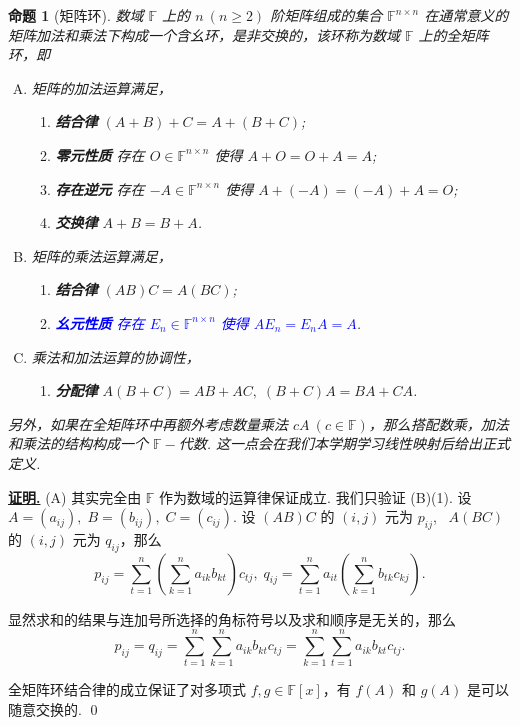 \documentclass[10pt,openany]{article}
\theoremstyle{thmstyle} %
\theoremstyle{defstyle} %
\theoremstyle{prostyle} %
\newtheorem{proposition}[theorem]{命题}
\theoremstyle{exastyle}
\theoremstyle{remstyle}
\renewenvironment{proof}[1][证明]{\par\underline{\textbf{#1.}} \;\fangsong}{\qed\par}
\newcommand{\F}{\mathbb{F}}
\begin{document}
\begin{proposition}[矩阵环]
	数域 \( \F \) 上的 \( n \ (n  \geq 2) \) 阶矩阵组成的集合 \( \F^{n \times n} \) 在通常意义的矩阵加法和乘法下构成一个含幺环，是非交换的，该环称为数域 \( \F \) 上的全矩阵环，即
	\begin{enumerate}[(A)]
		\item 矩阵的加法运算满足，
		\begin{enumerate}[(1)]
			\item \textbf{结合律} \( (A+B)+C=A+(B+C) \);
			\item \textbf{零元性质} 存在 \( O \in \F^{n \times n} \) 使得 \( A+O=O+A=A \);
			\item \textbf{存在逆元} 存在 \( -A \in \F^{n \times n} \) 使得 \( A+(-A)=(-A)+A=O \);
			\item \textbf{交换律} \( A+B=B+A \).
		\end{enumerate}
		\item 矩阵的乘法运算满足，
		\begin{enumerate}[(1)]
			\item \textbf{结合律} \( (AB)C=A(BC) \);
			\item \textcolor{blue}{\textbf{幺元性质} 存在 \( E_n \in \F^{n \times n} \) 使得 \( AE_n=E_nA=A \)}.
		\end{enumerate}
		\item 乘法和加法运算的协调性，
		\begin{enumerate}[(1)]
			\item \textbf{分配律} \( A(B+C)=AB+AC, \; (B+C)A=BA+CA \).
		\end{enumerate}
	\end{enumerate}
	
	另外，如果在全矩阵环中再额外考虑数量乘法 \( cA \ (c \in \F) \)，那么搭配数乘，加法和乘法的结构构成一个 \( \F-\)代数. 这一点会在我们本学期学习线性映射后给出正式定义.
\end{proposition}

\begin{proof}
    (A) 其实完全由 \( \F \) 作为数域的运算律保证成立. 我们只验证 (B)(1). 设 \( A=(a_{ij}), \; B=(b_{ij}), \; C=(c_{ij})\). 设 \( (AB)C \) 的 \( (i,j) \) 元为 \( p_{ij} \), \ \( A(BC) \) 的 \( (i,j) \) 元为 \( q_{ij} \)，那么
    \[ p_{ij}=\sum_{t=1}^{n}\left(\sum_{k=1}^{n}a_{ik}b_{kt} \right) c_{tj}, \; q_{ij}= \sum_{t=1}^{n} a_{it} \left( \sum_{k=1}^{n} b_{tk}c_{kj} \right). \]
    
    显然求和的结果与连加号所选择的角标符号以及求和顺序是无关的，那么
    \[ p_{ij}=q_{ij}=\sum_{t=1}^{n}\sum_{k=1}^{n}a_{ik}b_{kt}c_{tj}=\sum_{k=1}^{n}\sum_{t=1}^{n}a_{ik}b_{kt}c_{tj}. \]
    
    全矩阵环结合律的成立保证了对多项式 \( f,g \in \F[x] \)，有 \( f(A) \) 和 \( g(A) \) 是可以随意交换的.
\end{proof}
\end{document}
